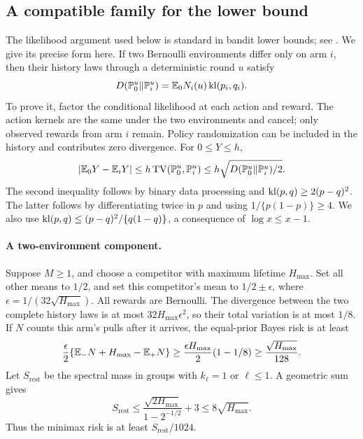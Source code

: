 \subsection{A compatible family for the lower bound}
The likelihood argument used below is standard in bandit lower bounds; see \citet{kaufmann2016complexity}. We give its precise form here. If two Bernoulli environments differ only on arm $i$, then their history laws through a deterministic round $u$ satisfy
\begin{equation}\label{eq:KL}
 D(\mathbb P_0^u\Vert\mathbb P_i^u)=\mathbb E_0N_i(u)\operatorname{kl}(p_i,q_i).
\end{equation}
To prove it, factor the conditional likelihood at each action and reward. The action kernels are the same under the two environments and cancel; only observed rewards from arm $i$ remain. Policy randomization can be included in the history and contributes zero divergence. For $0\le Y\le h$,
\begin{equation}\label{eq:TV}
 |\mathbb E_0Y-\mathbb E_iY|\le h\operatorname{TV}(\mathbb P_0^u,\mathbb P_i^u)
 \le h\sqrt{D(\mathbb P_0^u\Vert\mathbb P_i^u)/2}.
\end{equation}
The second inequality follows by binary data processing and $\operatorname{kl}(p,q)\ge2(p-q)^2$. The latter follows by differentiating twice in $p$ and using $1/\{p(1-p)\}\ge4$. We also use $\operatorname{kl}(p,q)\le(p-q)^2/\{q(1-q)\}$, a consequence of $\log x\le x-1$.

\paragraph{A two-environment component.}
Suppose $M\ge1$, and choose a competitor with maximum lifetime $H_{\max}$. Set all other means to $1/2$, and set this competitor's mean to $1/2\pm\epsilon$, where $\epsilon=1/(32\sqrt{H_{\max}})$. All rewards are Bernoulli. The divergence between the two complete history laws is at most $32H_{\max}\epsilon^2$, so their total variation is at most $1/8$. If $N$ counts this arm's pulls after it arrives, the equal-prior Bayes risk is at least
\begin{equation}\label{eq:single-lower}
 \frac\epsilon2\{\mathbb E_-N+H_{\max}-\mathbb E_+N\}
 \ge\frac{\epsilon H_{\max}}2(1-1/8)
 \ge\frac{\sqrt{H_{\max}}}{128}.
\end{equation}
Let $S_{\mathrm{rest}}$ be the spectral mass in groups with $k_\ell=1$ or $\ell\le1$. A geometric sum gives
\[
 S_{\mathrm{rest}}\le\frac{\sqrt{2H_{\max}}}{1-2^{-1/2}}+3
 \le8\sqrt{H_{\max}}.
\]
Thus the minimax risk is at least $S_{\mathrm{rest}}/1024$.

